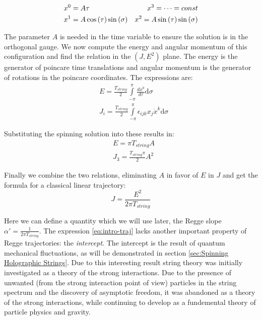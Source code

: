 \documentclass[11pt,a4paper]{article}
\begin{document}
\begin{align}
&x^0=A\tau &x^3=\cdots=const\notag\\
&x^1=A\cos\left(\tau\right)\sin\left(\sigma\right) &x^2=A\sin\left(\tau\right)\sin\left(\sigma\right)
\end{align}

The parameter $A$ is needed in the time variable to ensure the solution is in the orthogonal gauge. We now compute the energy and angular momentum of this configuration and find the relation in the $\left(J,E^2\right)$ plane. The energy is the generator of poincare time translations and angular momentum is the generator of rotations in the poincare coordinates. The expressions are:
\begin{subequations}
\begin{align}
&E=\frac{T_{string}}{2}\int\limits_{-\pi}^{\pi} \frac{dx^0}{d\tau} \mathrm{d}\sigma  \\
&J_i=\frac{T_{string}}{2}\int\limits_{-\pi}^{\pi}\epsilon_{ijk}x_j \dot{x}^k \mathrm{d}\sigma
\end{align}
\end{subequations}

Substituting the spinning solution into these results in:
\begin{subequations}
\begin{align}
&E=\pi T_{string} A \\
&J_3=\frac{T_{string}\pi}{2}A^2
\end{align}
\end{subequations}

Finally we combine the two relations, eliminating $A$ in favor of $E$ in $J$ and get the formula for a classical linear trajectory:
\begin{equation}
\label{eq:intro-traj}
J=\frac{E^2}{2\pi T_{string}}
\end{equation}

Here we can define a quantity which we will use later, the Regge slope $\alpha'=\frac{1}{2\pi T_{string}}$. The expression \ref{eq:intro-traj} lacks another important property of Regge trajectories: the \emph{intercept}. The intercept is the result of quantum mechanical fluctuations, as will be demonstrated in section \ref{sec:Spinning Holographic Strings}. Due to this interesting result string theory was initially investigated as a theory of the strong interactions. Due to the presence of unwanted (from the strong interaction point of view) particles in the string spectrum and the discovery of asymptotic freedom, it was abandoned as a theory of the strong interactions, while continuing to develop as a fundemental theory of particle physics and gravity.
\end{document}
